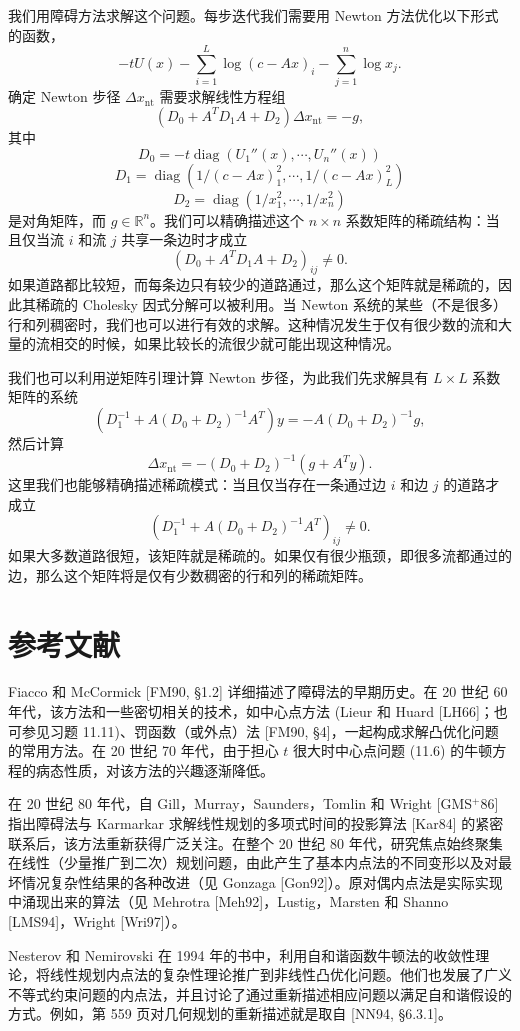 \documentclass[UTF8,12pt,a4paper,fontset=fandol]{ctexart}
\begin{document}
我们用障碍方法求解这个问题。每步迭代我们需要用 Newton 方法优化以下形式的函数，
\[
-tU(x)-\sum_{i=1}^L\log(c-Ax)_i-\sum_{j=1}^n\log x_j.
\]
确定 Newton 步径 $\Delta x_{\mathrm{nt}}$ 需要求解线性方程组
\[
(D_0+A^TD_1A+D_2)\Delta x_{\mathrm{nt}}=-g,
\]
其中
\[
D_0=-t\operatorname{diag}(U_1''(x),\cdots,U_n''(x))
\]
\[
D_1=\operatorname{diag}(1/(c-Ax)_1^2,\cdots,1/(c-Ax)_L^2)
\]
\[
D_2=\operatorname{diag}(1/x_1^2,\cdots,1/x_n^2)
\]
是对角矩阵，而 $g\in\mathbb{R}^n$。我们可以精确描述这个 $n\times n$ 系数矩阵的稀疏结构：当且仅当流 $i$ 和流 $j$ 共享一条边时才成立
\[
(D_0+A^TD_1A+D_2)_{ij}\neq 0.
\]
如果道路都比较短，而每条边只有较少的道路通过，那么这个矩阵就是稀疏的，因此其稀疏的 Cholesky 因式分解可以被利用。当 Newton 系统的某些（不是很多）行和列稠密时，我们也可以进行有效的求解。这种情况发生于仅有很少数的流和大量的流相交的时候，如果比较长的流很少就可能出现这种情况。

我们也可以利用逆矩阵引理计算 Newton 步径，为此我们先求解具有 $L\times L$ 系数矩阵的系统
\[
(D_1^{-1}+A(D_0+D_2)^{-1}A^T)y=-A(D_0+D_2)^{-1}g,
\]
然后计算
\[
\Delta x_{\mathrm{nt}}=-(D_0+D_2)^{-1}(g+A^Ty).
\]
这里我们也能够精确描述稀疏模式：当且仅当存在一条通过边 $i$ 和边 $j$ 的道路才成立
\[
(D_1^{-1}+A(D_0+D_2)^{-1}A^T)_{ij}\neq 0.
\]
如果大多数道路很短，该矩阵就是稀疏的。如果仅有很少瓶颈，即很多流都通过的边，那么这个矩阵将是仅有少数稠密的行和列的稀疏矩阵。

\section*{参考文献}

Fiacco 和 McCormick [FM90, \S1.2] 详细描述了障碍法的早期历史。在 20 世纪 60 年代，该方法和一些密切相关的技术，如中心点方法 (Lieur 和 Huard [LH66]；也可参见习题 11.11)、罚函数（或外点）法 [FM90, \S4]，一起构成求解凸优化问题的常用方法。在 20 世纪 70 年代，由于担心 $t$ 很大时中心点问题 (11.6) 的牛顿方程的病态性质，对该方法的兴趣逐渐降低。

在 20 世纪 80 年代，自 Gill，Murray，Saunders，Tomlin 和 Wright [GMS$^+$86] 指出障碍法与 Karmarkar 求解线性规划的多项式时间的投影算法 [Kar84] 的紧密联系后，该方法重新获得广泛关注。在整个 20 世纪 80 年代，研究焦点始终聚集在线性（少量推广到二次）规划问题，由此产生了基本内点法的不同变形以及对最坏情况复杂性结果的各种改进（见 Gonzaga [Gon92]）。原对偶内点法是实际实现中涌现出来的算法（见 Mehrotra [Meh92]，Lustig，Marsten 和 Shanno [LMS94]，Wright [Wri97]）。

Nesterov 和 Nemirovski 在 1994 年的书中，利用自和谐函数牛顿法的收敛性理论，将线性规划内点法的复杂性理论推广到非线性凸优化问题。他们也发展了广义不等式约束问题的内点法，并且讨论了通过重新描述相应问题以满足自和谐假设的方式。例如，第 559 页对几何规划的重新描述就是取自 [NN94, \S6.3.1]。
\end{document}
